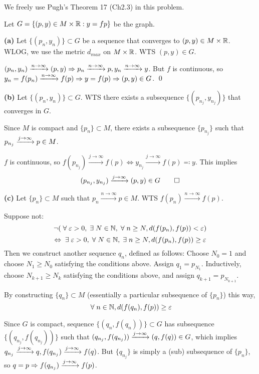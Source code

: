 \documentclass[a4paper, 12pt]{article}
\begin{document}
\begin{solution}

    We freely use Pugh's Theorem 17 (Ch2.3) in this problem.

    Let $G = \{(p, y) \in M \times \mathbb{R} : y = fp\} $ be the graph. \par

    \textbf{(a)} Let $\{(p_n, y_n)\} \subset G$ be a sequence that converges to $(p, y) \in M \times \mathbb{R}$. WLOG, we use the metric $d_{max}$ on $M \times \mathbb{R}$. WTS $(p, y) \in G$.

    $(p_n, y_n) \xrightarrow{n \to \infty} (p, y) \Rightarrow p_n \xrightarrow{n \to \infty} p, y_n \xrightarrow{n \to \infty} y$. But $f$ is continuous, so $y_n = f(p_n) \xrightarrow{n \to \infty} f(p) \Rightarrow y = f(p) \Rightarrow (p, y) \in G$. \qed \par

    \textbf{(b)} Let $\{(p_n, y_n)\} \subset G$. WTS there exists a subsequence $\{(p_{n_j}, y_{n_j})\}$ that converges in $G$.

    Since $M$ is compact and $\{p_n\} \subset M$, there exists a subsequence $\{p_{n_j}\}$ such that $ p_{n_j} \xrightarrow{j \to \infty} p \in M$.

    $f$ is continuous, so $f(p_{n_j}) \xrightarrow{j \to \infty} f(p) \Leftrightarrow y_{n_j} \xrightarrow{j \to \infty} f(p) \eqqcolon y$.
    This implies \[
        (p_{n_j}, y_{n_j}) \xrightarrow{j \to \infty} (p, y) \in G \qed
    \]

    \textbf{(c)} Let $\{p_n\} \subset M$ such that $p_n \xrightarrow{n \to \infty} p \in M$. WTS $f(p_n) \xrightarrow{n \to \infty} f(p)$.

    Suppose not:
    \[
        \neg (\forall \epsilon > 0, \exists N \in \bbn, \forall n \geq N, d(f(p_n), f(p)) < \epsilon)
    \]
    \[
        \Leftrightarrow \exists \epsilon > 0, \forall N \in \bbn, \exists n \geq N, d(f(p_n), f(p)) \geq \epsilon
    \]
    Then we construct another sequence $q_n$, defined as follows:
    Choose $N_0 = 1$ and choose $N_1 \geq N_0$ satisfying the conditions above. Assign $q_1 = p_{N_1}$.
    Inductively, choose $N_{k+1} \geq N_{k}$ satisfying the conditions above, and assign $q_{k+1} = p_{N_{k+1}}$.

    By constructing $\{q_n\} \subset M$ (essentially a particular subsequence of $\{p_n\}$) this way, \[
        \forall n \in \bbn, d(f(q_n), f(p)) \geq \epsilon
    \]

    Since $G$ is compact, sequence $\{(q_n, f(q_n))\} \subset G$ has subsequence $\{(q_{n_j}, f(q_{n_j}))\}$ such that $(q_{n_j}, f(q_{n_j})) \xrightarrow{j \to \infty} (q, f(q)) \in G$, which implies $q_{n_j} \xrightarrow{j \to \infty} q, f(q_{n_j}) \xrightarrow{j \to \infty} f(q)$. But $\{q_{n_j}\}$ is simply a (sub) subsequence of $\{p_n\}$, so $q = p \Rightarrow f(q_{n_j}) \xrightarrow{j \to \infty} f(p)$.


\end{solution}
\end{document}
